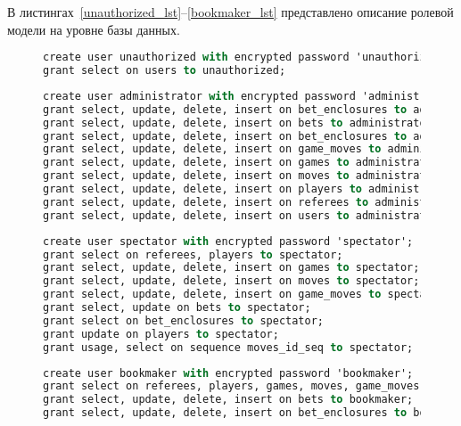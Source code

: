 В листингах~\ref{unauthorized_lst}--\ref{bookmaker_lst} представлено описание ролевой модели на уровне базы данных.

\begin{figure}[H]
	\begin{lstlisting}[label=unauthorized_lst,caption=Описание роли неаторизованного пользователя,language=Caml]
create user unauthorized with encrypted password 'unauthorized';
grant select on users to unauthorized;
	\end{lstlisting}
\end{figure}
\begin{figure}[H]
	\begin{lstlisting}[label=administrator_lst,caption=Описание роли администратора,language=Caml]
create user administrator with encrypted password 'administrator';
grant select, update, delete, insert on bet_enclosures to administrator;
grant select, update, delete, insert on bets to administrator;
grant select, update, delete, insert on bet_enclosures to administrator;
grant select, update, delete, insert on game_moves to administrator;
grant select, update, delete, insert on games to administrator;
grant select, update, delete, insert on moves to administrator;
grant select, update, delete, insert on players to administrator;
grant select, update, delete, insert on referees to administrator;
grant select, update, delete, insert on users to administrator;
	\end{lstlisting}
\end{figure}
\begin{figure}[H]
	\begin{lstlisting}[label=spectator_lst,caption=Описание роли наблюдателя,language=Caml]
create user spectator with encrypted password 'spectator';
grant select on referees, players to spectator;
grant select, update, delete, insert on games to spectator;
grant select, update, delete, insert on moves to spectator;
grant select, update, delete, insert on game_moves to spectator;
grant select, update on bets to spectator;
grant select on bet_enclosures to spectator;
grant update on players to spectator;
grant usage, select on sequence moves_id_seq to spectator;
	\end{lstlisting}
\end{figure}
\begin{figure}[H]
	\begin{lstlisting}[label=bookmaker_lst,caption=Описание роли букмекера,language=Caml]
create user bookmaker with encrypted password 'bookmaker';
grant select on referees, players, games, moves, game_moves to bookmaker;
grant select, update, delete, insert on bets to bookmaker;
grant select, update, delete, insert on bet_enclosures to bookmaker;
	\end{lstlisting}
\end{figure}

